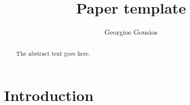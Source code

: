 \documentclass{article}
\begin{document}
\title{Paper template}
\author{Georgios Gousios}

\maketitle

\begin{abstract}
The abstract text goes here.
\end{abstract}

\section{Introduction}



\end{document}
